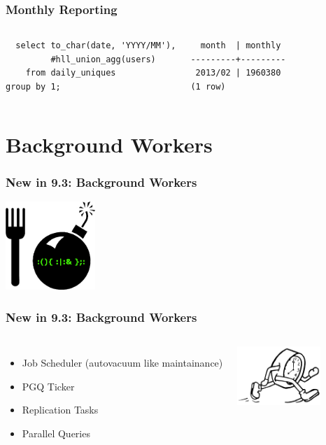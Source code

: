 \documentclass{beamer}
\begin{document}
\begin{frame}[fragile]
  \frametitle{Monthly Reporting}

\begin{columns}
\begin{verbatim}
  select to_char(date, 'YYYY/MM'),
         #hll_union_agg(users)
    from daily_uniques
group by 1;
\end{verbatim}  
\begin{verbatim}     
  month  | monthly 
---------+---------
 2013/02 | 1960380
(1 row)
\end{verbatim}  
\end{columns}
\end{frame}

\section{Background Workers}

\begin{frame}[fragile]
  \frametitle{New in 9.3: Background Workers}

\begin{center}
  \includegraphics[height=9em]{fork-bomb.png}
\end{center}
\end{frame}

\begin{frame}[fragile]
  \frametitle{New in 9.3: Background Workers}

  \vfill

\begin{columns}
  \begin{itemize}
  \item Job Scheduler (autovacuum like maintainance)
  \item PGQ Ticker
  \item Replication Tasks
  \item Parallel Queries
  \end{itemize}
\begin{center}
  \includegraphics[height=6em]{clock.png}
\end{center}
\end{columns}
\end{frame}
\end{document}
